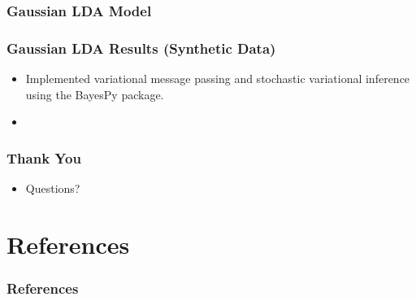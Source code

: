 \documentclass{beamer}
\begin{document}

\begin{frame}
  \frametitle{Gaussian LDA Model} 
\end{frame}

\begin{frame}
  \frametitle{Gaussian LDA Results (Synthetic Data)}
  \begin{itemize}
    \item Implemented variational message passing \citep{Winn05} and stochastic variational inference using the BayesPy \citep{Luttinen14} package. 
    \item 
  \end{itemize}
\end{frame}

\begin{frame}
  \frametitle{Thank You}
  \begin{itemize}
  \item Questions?
  \end{itemize}
\end{frame}

\section{References}
\begin{frame}[t,allowframebreaks]{}
\frametitle{References}
{\small
\printbibliography
\par}
\end{frame}
\end{document}
